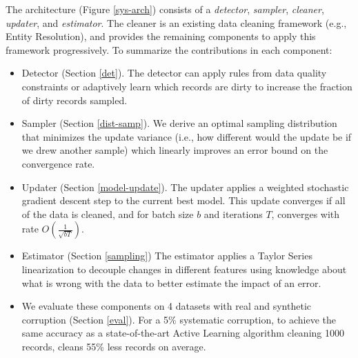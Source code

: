 The \sys architecture (Figure \ref{sys-arch}) consists of a \emph{detector}, \emph{sampler}, \emph{cleaner}, \emph{updater}, and \emph{estimator}.
The cleaner is an existing data cleaning framework (e.g., Entity Resolution), and \sys provides the remaining components to apply this framework progressively.
To summarize the contributions in each component:
\begin{itemize}[noitemsep]
\item Detector (Section \ref{det}). The detector can apply rules from data quality constraints or adaptively learn which records are dirty to increase the fraction of dirty records sampled.
\item Sampler (Section \ref{dist-samp}). We derive an optimal sampling distribution that minimizes the update variance (i.e., how different would the update be if we drew another sample) which linearly improves an error bound on the convergence rate.
\item Updater (Section \ref{model-update}). The updater applies a weighted stochastic gradient descent step to the current best model. This update converges if all of the data is cleaned, and for batch size $b$ and iterations $T$, converges with rate $O(\frac{1}{\sqrt{bT}})$. 
\item Estimator (Section \ref{sampling}) The estimator applies a Taylor Series linearization to decouple changes in different features using knowledge about what is wrong with the data to better estimate the impact of an error.
\item We evaluate these components on 4 datasets with real and synthetic corruption (Section \ref{eval}). For a 5\%  systematic corruption, to achieve the same accuracy as a state-of-the-art Active Learning algorithm cleaning 1000 records, \sys cleans 55\% less records on average.
\end{itemize}






